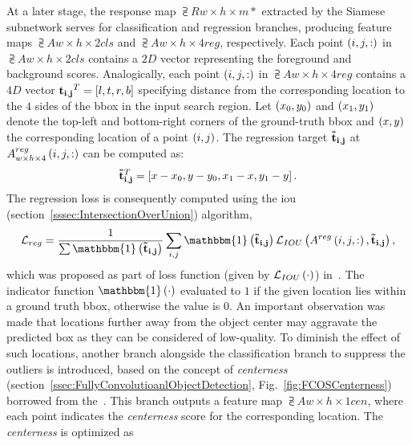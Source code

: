 At a later stage, the response map $\supsub{R}{w \times h \times m}{*}$ extracted by the Siamese subnetwork serves for classification and regression branches, producing feature maps $\supsub{A}{w \times h \times 2}{cls}$ and $\supsub{A}{w \times h \times 4}{reg}$, respectively. Each point $\left( {i, j, :} \right)$ in $\supsub{A}{w \times h \times 2}{cls}$ contains a $2D$ vector representing the foreground and background scores. Analogically, each point $\left( {i, j, :} \right)$ in $\supsub{A}{w \times h \times 4}{reg}$ contains a $4D$ vector ${\mathbf{t_{i, j}}}^T = \left[ {l, t, r, b} \right]$ specifying distance from the corresponding location to the $4$ sides of the \gls{bbox} in the input search region. Let $\left( {x_0, y_0} \right)$ and $\left( {x_1, y_1} \right)$ denote the top-left and bottom-right corners of the ground-truth \gls{bbox} and $\left( {x, y} \right)$ the corresponding location of a point $\left( {i, j} \right)$. The regression target $\mathbf{\tilde{t}_{i, j}}$ at ${A}_{w \times h \times 4}^{reg} \left( {i, j, :} \right)$ can be computed as:
\begin{equation}
    {\mathbf{\tilde{t}_{i, j}}}^T = \left[ {x - x_0, y - y_0, x_1 - x, y_1 - y} \right].
\end{equation}
The regression loss is consequently computed using the \gls{iou} (section~\ref{sssec:IntersectionOverUnion}) algorithm,
\begin{equation}
    \label{eq:SiamCARRegLoss}
    \mathcal{L}_{reg} =
    \frac{1}{\sum \func{\mathbbm{1}}{\vect{\tilde{t}_{i, j}}}}
    \sum_{i, j}
    \func{\mathbbm{1}}{\vect{\tilde{t}_{i, j}}}
    \func{\mathcal{L}_{IOU}}{\func{A^{reg}}{i, j, :}, \vect{\tilde{t}_{i, j}}},
\end{equation}
which was proposed as part of loss function (given by ${\mathcal{L}_{IOU}} \left( \cdot \right)$) in~\cite{Yu2016}. The indicator function $\func{\mathbbm{1}}{\cdot}$ evaluated to $1$ if the given location lies within a ground truth \gls{bbox}, otherwise the value is $0$. An important observation was made that locations further away from the object center may aggravate the predicted box as they can be considered of low-quality. To diminish the effect of such locations, another branch alongside the classification branch to suppress the outliers is introduced, based on the concept of \emph{centerness} (section~\ref{ssec:FullyConvolutioanlObjectDetection}, Fig.~\ref{fig:FCOSCenterness}) borrowed from the~\cite{Tian2019}. This branch outputs a feature map $\supsub{A}{w \times h \times 1}{cen}$, where each point indicates the \emph{centerness} score for the corresponding location. The \emph{centerness} is optimized as

